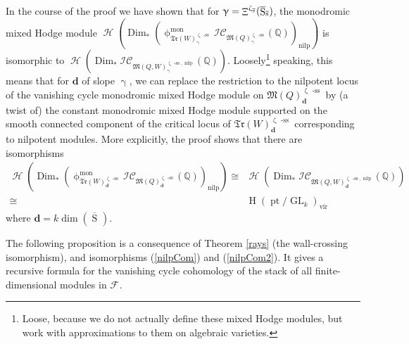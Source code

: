 \documentclass[a4paper,10pt]{amsart}
\newcommand{\dd}{\mathbf{d}}
\DeclareMathOperator{\Simp}{S}
\newcommand{\WWW}{\mathfrak{Tr}(W)}
\newcommand{\Mst}{\mathfrak{M}}
\newcommand{\ICS}{\mathcal{IC}}
\newcommand{\phim}[1]{\phi^{\mon}_{#1}}
\newcommand{\shave}{\overline{\Simp}_{\Ss}}
\renewcommand{\gamma}{\upgamma}
\renewcommand{\zeta}{\upzeta}
\renewcommand{\phi}{\upphi}
\DeclareMathOperator{\sst}{-ss}
\DeclareMathOperator{\nilp}{nilp}
\DeclareMathOperator{\Dim}{Dim}
\DeclareMathOperator{\mon}{mon}
\DeclareMathOperator{\Mu}{\Upxi}
\DeclareMathOperator{\Gl}{GL}
\DeclareMathOperator{\pt}{pt}
\DeclareMathOperator{\Ss}{\overline{s}}
\DeclareMathOperator{\vir}{vir}
\DeclareMathOperator{\Ho}{\mathcal{H}}
\DeclareMathOperator{\HO}{H}
\begin{document}
In the course of the proof we have shown that for $\gamma=\Mu^{\zeta_{\Ss}}(\shave)$, the monodromic mixed Hodge module $\Ho\left(\Dim_*\left(\phim{\WWW^{\zeta_{\Ss}\sst}_{\gamma}}\ICS_{\Mst(Q)^{\zeta_{\Ss}\sst}_{\gamma}}(\mathbb{Q})\right)_{\nilp}\right)$ is isomorphic to $\Ho\left(\Dim_*\ICS_{\Mst(Q,W)_{\gamma}^{\zeta_{\Ss}\sst,\nilp}}(\mathbb{Q})\right)$.  Loosely\footnote{Loose, because we do not actually define these mixed Hodge modules, but work with approximations to them on algebraic varieties.} speaking, this means that for $\dd$ of slope $\gamma$, we can replace the restriction to the nilpotent locus of the vanishing cycle monodromic mixed Hodge module on $\Mst(Q)^{\zeta_{\Ss}\sst}_{\dd}$ by (a twist of) the constant monodromic mixed Hodge module supported on the smooth connected component of the critical locus of $\WWW_{\dd}^{\zeta_{\Ss}\sst}$ corresponding to nilpotent modules.  More explicitly, the proof shows that there are isomorphisms
\begin{align}
\Ho\left(\Dim_*\left(\phim{\WWW^{\zeta_{\Ss}\sst}_{\dd}}\ICS_{\Mst(Q)^{\zeta_{\Ss}\sst}_{\dd}}(\mathbb{Q})\right)_{\nilp}\right)\cong\nonumber
&
\Ho\left(\Dim_*\ICS_{\Mst(Q,W)_{\dd}^{\zeta_{\Ss}\sst,\nilp}}(\mathbb{Q})\right)\\
\cong&\HO(\pt/\Gl_k)_{\vir}\label{Glout}
\end{align}
where $\dd=k\dim(\shave)$.

The following proposition is a consequence of Theorem \ref{rays} (the wall-crossing isomorphism), and isomorphisms (\ref{nilpCom}) and (\ref{nilpCom2}).  It gives a recursive formula for the vanishing cycle cohomology of the stack of all finite-dimensional modules in $\mathcal{F}_{\Ss}$.
\end{document}
